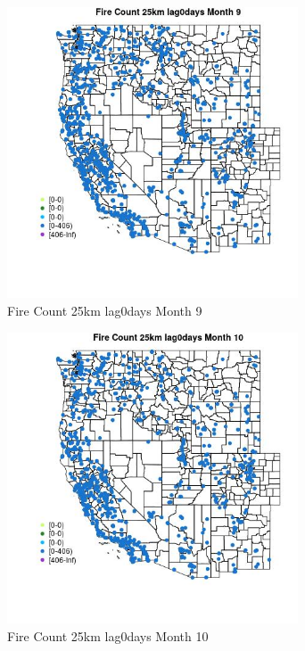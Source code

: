 \begin{figure} 
\centering  
\includegraphics[width=0.77\textwidth]{Code_Outputs/Report_ML_input_PM25_Step4_part_f_de_duplicated_aveswNAs_MapObsMo9Fire_Count_25km_lag0days.jpg} 
\caption{\label{fig:Report_ML_input_PM25_Step4_part_f_de_duplicated_aveswNAsMapObsMo9Fire_Count_25km_lag0days}Fire Count 25km lag0days Month 9} 
\end{figure} 
 

\begin{figure} 
\centering  
\includegraphics[width=0.77\textwidth]{Code_Outputs/Report_ML_input_PM25_Step4_part_f_de_duplicated_aveswNAs_MapObsMo10Fire_Count_25km_lag0days.jpg} 
\caption{\label{fig:Report_ML_input_PM25_Step4_part_f_de_duplicated_aveswNAsMapObsMo10Fire_Count_25km_lag0days}Fire Count 25km lag0days Month 10} 
\end{figure} 
 

